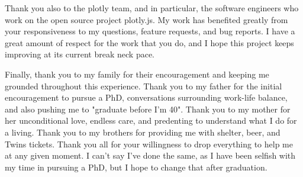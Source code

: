 Thank you also to the plotly team, and in particular, the software engineers who work on the open source project plotly.js. My work has benefited greatly from your responsiveness to my questions, feature requests, and bug reports. I have a great amount of respect for the work that you do, and I hope this project keeps improving at its current break neck pace.

Finally, thank you to my family for their encouragement and keeping me grounded throughout this experience. Thank you to my father for the initial encouragement to pursue a PhD, conversations surrounding work-life balance, and also pushing me to "graduate before I'm 40". Thank you to my mother for her unconditional love, endless care, and predenting to understand what I do for a living. Thank you to my brothers for providing me with shelter, beer, and Twins tickets. Thank you all for your willingness to drop everything to help me at any given moment. I can't say I've done the same, as I have been selfish with my time in pursuing a PhD, but I hope to change that after graduation.

